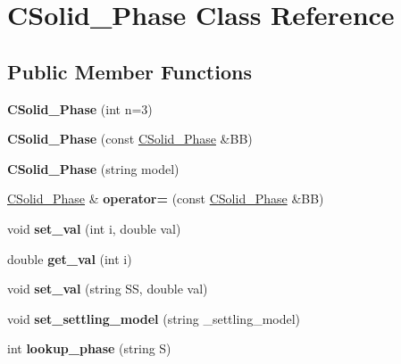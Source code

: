 \hypertarget{class_c_solid___phase}{}\section{C\+Solid\+\_\+\+Phase Class Reference}
\label{class_c_solid___phase}
\subsection*{Public Member Functions}
\begin{DoxyCompactItemize}
\item 
\mbox{\label{class_c_solid___phase_adfec130150c6abb8028dd00e65ec197d}} 
{\bfseries C\+Solid\+\_\+\+Phase} (int n=3)
\item 
\mbox{\label{class_c_solid___phase_aef6a6d6640c5bc3c03244362e531fdad}} 
{\bfseries C\+Solid\+\_\+\+Phase} (const \hyperlink{class_c_solid___phase}{C\+Solid\+\_\+\+Phase} \&BB)
\item 
\mbox{\label{class_c_solid___phase_a0b2dc136e1ba7e27a843738ebdb4a0c8}} 
{\bfseries C\+Solid\+\_\+\+Phase} (string model)
\item 
\mbox{\label{class_c_solid___phase_a613b6a905b336d39354aabe5e1f2cd18}} 
\hyperlink{class_c_solid___phase}{C\+Solid\+\_\+\+Phase} \& {\bfseries operator=} (const \hyperlink{class_c_solid___phase}{C\+Solid\+\_\+\+Phase} \&BB)
\item 
\mbox{\label{class_c_solid___phase_adb3ff76d1c1d0a03859d9807c3047950}} 
void {\bfseries set\+\_\+val} (int i, double val)
\item 
\mbox{\label{class_c_solid___phase_af5a4a11ad9fcb67bdd94b62f8648fc42}} 
double {\bfseries get\+\_\+val} (int i)
\item 
\mbox{\label{class_c_solid___phase_a2ac00be24d8f5d61bb0ecf6ee67cb5b0}} 
void {\bfseries set\+\_\+val} (string SS, double val)
\item 
\mbox{\label{class_c_solid___phase_a37038752e67dc4e7e31f94e515f08bc8}} 
void {\bfseries set\+\_\+settling\+\_\+model} (string \+\_\+settling\+\_\+model)
\item 
\mbox{\label{class_c_solid___phase_a9e9d4d6837bd2d6211b1dd78a1716c4f}} 
int {\bfseries lookup\+\_\+phase} (string S)
\end{DoxyCompactItemize}
